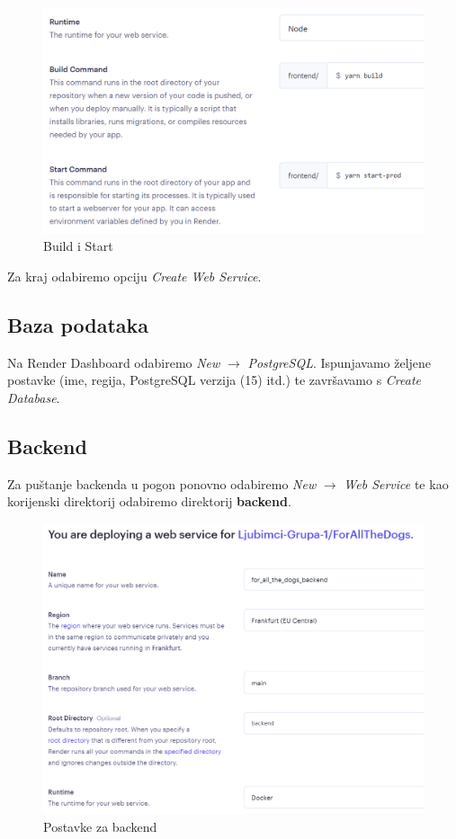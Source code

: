 			\begin{figure}[H]
				\includegraphics[scale=0.6]{slike/frontend_2.PNG} 
				\centering
				\caption{Build i Start}
				\label{frontend_2}
			\end{figure}
			
			Za kraj odabiremo opciju \textit{Create Web Service}.
			
			\subsection{Baza podataka}
			
			Na Render Dashboard odabiremo \textit{New} $\rightarrow$ \textit{PostgreSQL}. Ispunjavamo željene postavke (ime, regija, PostgreSQL verzija (15) itd.) te završavamo s \textit{Create Database}.
			
			\subsection{Backend}
			
			Za puštanje backenda u pogon ponovno odabiremo \textit{New} $\rightarrow$ \textit{Web Service} te kao korijenski direktorij odabiremo direktorij \textbf{backend}.
			
			\begin{figure}[H]
				\includegraphics[scale=0.6]{slike/backend.PNG} 
				\centering
				\caption{Postavke za backend}
				\label{backend}
			\end{figure}
			
